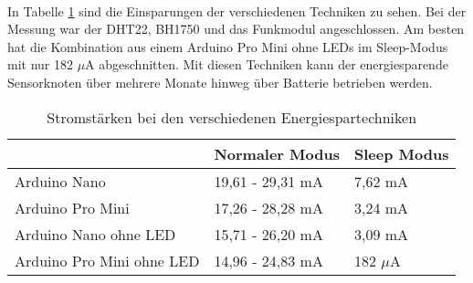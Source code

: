 \paragraph{} In Tabelle \ref{tbl:Energiesparen} sind die Einsparungen der verschiedenen Techniken zu sehen. Bei der Messung war der DHT22, BH1750 und das Funkmodul angeschlossen. Am besten hat die Kombination aus einem Arduino Pro Mini ohne LEDs im Sleep-Modus mit nur 182 $\mu$A  abgeschnitten. Mit diesen Techniken kann der energiesparende Sensorknoten über mehrere Monate hinweg über Batterie betrieben werden. 
\begin{table}[]
	\centering
	\caption{Stromstärken bei den verschiedenen Energiespartechniken}
	\label{tbl:Energiesparen}
	\begin{tabular}{l|l|l}
		& Normaler Modus   & Sleep Modus \\ \hline
		Arduino Nano              & 19,61 - 29,31 mA & 7,62 mA     \\ \hline
		Arduino Pro Mini          & 17,26 - 28,28 mA & 3,24 mA     \\ \hline
		Arduino Nano ohne LED     & 15,71 - 26,20 mA & 3,09 mA     \\ \hline
		Arduino Pro Mini ohne LED & 14,96 - 24,83 mA & 182 $\mu$A     
	\end{tabular}
\end{table}
